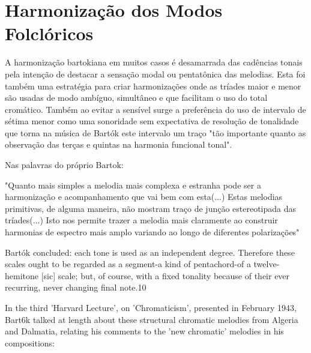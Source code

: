 \documentclass[
	12pt,				%
	openright,			%
	twoside,			%
	a4paper,			%
	english,			%
	french,				%
	spanish,			%
	brazil				%
	]{abntex2}
\begin{document}







 

  



\section{Harmonização dos Modos Folclóricos}


A harmonização  bartokiana em muitos casos é desamarrada das cadências tonais pela intenção de destacar a sensação modal ou pentatônica das melodias. Esta foi também uma estratégia para criar harmonizações onde as tríades maior e menor são usadas de modo ambíguo, simultâneo e que facilitam o uso do total cromático. Também ao evitar a sensível surge a preferência do uso de intervalo de sétima menor como uma sonoridade sem expectativa de resolução de tonalidade que torna na música de Bartók este intervalo um traço "tão importante quanto as observação das terças e quintas na harmonia funcional tonal"\cite[p. 28]{antokoletz1984music}.

Nas palavras do próprio Bartok:

\begin{citacao}
"Quanto mais simples a melodia mais complexa e estranha pode ser a harmonização e acompanhamento que vai bem com esta(...) Estas melodias primitivas, de alguma maneira, não mostram traço de junção estereotipada das tríades(...) Isto nos permite trazer a melodia mais claramente ao construir harmonias de espectro mais amplo variando ao longo de diferentes polarizações"
\cite[p. 342]{bartok1993bela}
\end{citacao}


Bartók concluded:
each tone is used as an independent degree. Therefore these scales ought to be regarded as a segment-a kind of
pentachord-of a twelve-hemitone [sic] scale; but, of course, with a fixed tonality because of their ever
recurring, never changing final note.10

In the third 'Harvard Lecture', on 'Chromaticism', presented in February 1943,
Bart6k talked at length about these structural chromatic melodies from Algeria and
Dalmatia, relating his comments to the 'new chromatic' melodies in his compositions:
\end{document}
